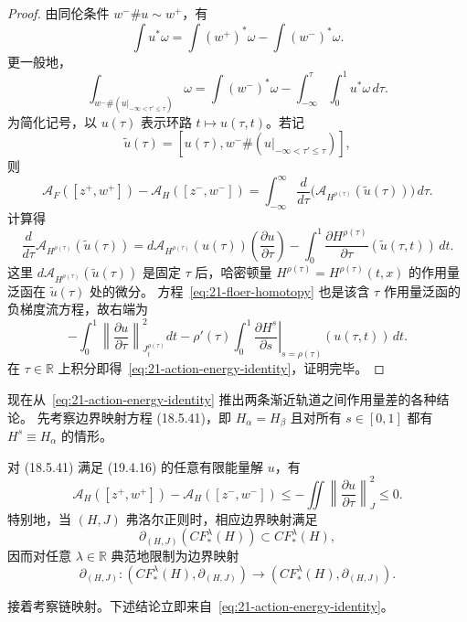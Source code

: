\begin{proof}
由同伦条件 $w^-\#u\sim w^+$，有
\[
 \int u^*\omega=\int(w^+)^*\omega-\int(w^-)^*\omega.
\]
更一般地，
\[
 \int_{w^-\#(u|_{-\infty<\tau'\leq\tau})}\omega
 =\int(w^-)^*\omega-\int_{-\infty}^{\tau}\!\int_0^1u^*\omega\,d\tau.
\]
为简化记号，以 $u(\tau)$ 表示环路 $t\mapsto u(\tau,t)$。若记
\[
 \widetilde u(\tau)=
 [u(\tau),w^-\#(u|_{-\infty<\tau'\leq\tau})],
\]
则
\[
 \mathcal A_F([z^+,w^+])-\mathcal A_H([z^-,w^-])
 =\int_{-\infty}^{\infty}\frac d{d\tau}
 \bigl(\mathcal A_{H^{\rho(\tau)}}(\widetilde u(\tau))\bigr)\,d\tau.
\]
计算得
\[
 \frac d{d\tau}\mathcal A_{H^{\rho(\tau)}}(\widetilde u(\tau))
 =d\mathcal A_{H^{\rho(\tau)}}(u(\tau))
 \left(\frac{\partial u}{\partial\tau}\right)
 -\int_0^1\frac{\partial H^{\rho(\tau)}}{\partial\tau}
 (\widetilde u(\tau,t))\,dt.
\]
这里 $d\mathcal A_{H^{\rho(\tau)}}(\widetilde u(\tau))$ 是固定 $\tau$ 后，哈密顿量
$H^{\rho(\tau)}=H^{\rho(\tau)}(t,x)$ 的作用量泛函在 $\widetilde u(\tau)$ 处的微分。
方程~\eqref{eq:21-floer-homotopy} 也是该含 $\tau$ 作用量泛函的负梯度流方程，故右端为
\[
 -\int_0^1\left\lVert\frac{\partial u}{\partial\tau}\right\rVert_{J_t^{\rho(\tau)}}^2dt
 -\rho'(\tau)\int_0^1
 \left.\frac{\partial H^s}{\partial s}\right|_{s=\rho(\tau)}
 (u(\tau,t))\,dt.
\]
在 $\tau\in\mathbb R$ 上积分即得~\eqref{eq:21-action-energy-identity}，证明完毕。
\end{proof}

现在从~\eqref{eq:21-action-energy-identity} 推出两条渐近轨道之间作用量差的各种结论。
先考察边界映射方程 (18.5.41)，即 $H_\alpha=H_\beta$ 且对所有
$s\in[0,1]$ 都有 $H^s\equiv H_\alpha$ 的情形。

\begin{corollary}
\label{cor:21-boundary-filtration}
对 (18.5.41) 满足 (19.4.16) 的任意有限能量解 $u$，有
\begin{equation}
 \mathcal A_H([z^+,w^+])-\mathcal A_H([z^-,w^-])
 \leq-\iint\left\lVert\frac{\partial u}{\partial\tau}\right\rVert_J^2\leq0.
 \label{eq:21-boundary-action-drop}
\end{equation}
特别地，当 $(H,J)$ 弗洛尔正则时，相应边界映射满足
\[
 \partial_{(H,J)}(CF_*^\lambda(H))\subset CF_*^\lambda(H),
\]
因而对任意 $\lambda\in\mathbb R$ 典范地限制为边界映射
\[
 \partial_{(H,J)}:(CF_*^\lambda(H),\partial_{(H,J)})
 \longrightarrow(CF_*^\lambda(H),\partial_{(H,J)}).
\]
\end{corollary}

接着考察链映射。下述结论立即来自~\eqref{eq:21-action-energy-identity}。

